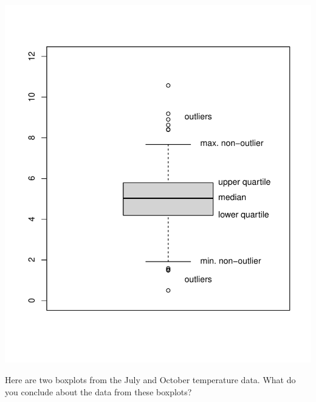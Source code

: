 \documentclass[
  a4paper,
]{book}
\newenvironment{Shaded}{\begin{snugshade}}{\end{snugshade}}
\newcommand{\AttributeTok}[1]{\textcolor[rgb]{0.77,0.63,0.00}{#1}}
\newcommand{\FunctionTok}[1]{\textcolor[rgb]{0.00,0.00,0.00}{#1}}
\newcommand{\NormalTok}[1]{#1}
\newcommand{\SpecialCharTok}[1]{\textcolor[rgb]{0.00,0.00,0.00}{#1}}
\newcommand{\StringTok}[1]{\textcolor[rgb]{0.31,0.60,0.02}{#1}}
\theoremstyle{definition}
\theoremstyle{definition}
\theoremstyle{definition}
\theoremstyle{definition}
\theoremstyle{remark}
\begin{document}
\begin{center}\includegraphics{math1710_files/figure-latex/boxplot1-1} \end{center}

Here are two boxplots from the July and October temperature data. What do you conclude about the data from these boxplots?

\begin{Shaded}
\end{Shaded}
\end{document}
